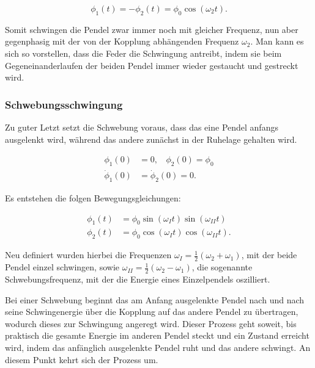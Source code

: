 \documentclass{article}
\begin{document}
\begin{equation}
    \phi_1(t) = -\phi_2(t) = \phi_0 \cos{(\omega_2 t)}.
    \label{eq:EOMasymm}
\end{equation}

Somit schwingen die Pendel zwar immer noch mit gleicher Frequenz, nun aber gegenphasig mit der von der Kopplung abhängenden Frequenz $\omega_2$. Man kann es sich so vorstellen, dass die Feder die Schwingung antreibt, indem sie beim Gegeneinanderlaufen der beiden Pendel immer wieder gestaucht und gestreckt wird.

\subsubsection{Schwebungsschwingung}

Zu guter Letzt setzt die Schwebung voraus, dass das eine Pendel anfangs ausgelenkt wird, während das andere zunächst in der Ruhelage gehalten wird.

\begin{equation}
    \begin{split}
        \phi_1 (0) &=0, \ \ \ \ \phi_2 (0) = \phi_0 \\
        \dot{\phi}_1 (0) &= \dot{\phi}_2 (0) = 0.
    \end{split}
\end{equation}

Es entstehen die folgen Bewegungsgleichungen:

\begin{equation}
    \begin{split}
        \phi_1(t) &= \phi_0 \sin{(\omega_I t)} \sin{(\omega_{II} t)} \\
        \phi_2(t) &= \phi_0 \cos{(\omega_I t)} \cos{(\omega_{II} t)}.
    \end{split}
    \label{eq:EOMbeat}
\end{equation}

Neu definiert wurden hierbei die Frequenzen $\omega_I = \frac{1}{2}(\omega_2 + \omega_1)$, mit der beide Pendel einzel schwingen, sowie $\omega_{II} = \frac{1}{2}(\omega_2 - \omega_1)$, die sogenannte Schwebungsfrequenz, mit der die Energie eines Einzelpendels oszilliert. 

Bei einer Schwebung beginnt das am Anfang ausgelenkte Pendel nach und nach seine Schwingenergie über die Kopplung auf das andere Pendel zu übertragen, wodurch dieses zur Schwingung angeregt wird. Dieser Prozess geht soweit, bis praktisch die gesamte Energie im anderen Pendel steckt und ein Zustand erreicht wird, indem das anfänglich ausgelenkte Pendel ruht und das andere schwingt. An diesem Punkt kehrt sich der Prozess um.
\end{document}
